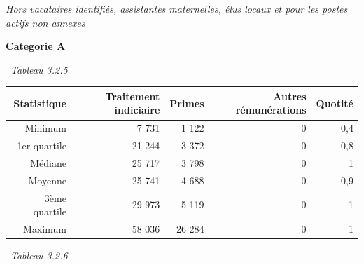 \emph{Hors vacataires identifiés, assistantes maternelles, élus locaux
et pour les postes actifs non annexes}

\textbf{Categorie A}

~\emph{Tableau 3.2.5}

\begin{longtable}[]{@{}rrrrr@{}}
\toprule
Statistique & Traitement indiciaire & Primes & Autres rémunérations &
Quotité\tabularnewline
\midrule
\endhead
Minimum & 7 731 & 1 122 & 0 & 0,4\tabularnewline
1er quartile & 21 244 & 3 372 & 0 & 0,8\tabularnewline
Médiane & 25 717 & 3 798 & 0 & 1\tabularnewline
Moyenne & 25 741 & 4 688 & 0 & 0,9\tabularnewline
3ème quartile & 29 973 & 5 119 & 0 & 1\tabularnewline
Maximum & 58 036 & 26 284 & 0 & 1\tabularnewline
\bottomrule
\end{longtable}

~\emph{Tableau 3.2.6}

